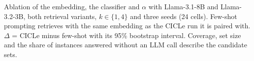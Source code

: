 \begin{table}[t]
  \centering
  \footnotesize
  \setlength{\tabcolsep}{4pt}
  \resizebox{\textwidth}{!}{}
  \caption{Ablation of the embedding, the classifier and $\alpha$ with Llama-3.1-8B and Llama-3.2-3B, both retrieval variants, $k \in \{1, 4\}$ and three seeds (24 cells). Few-shot prompting retrieves with the same embedding as the CICLe run it is paired with. $\Delta$ = CICLe minus few-shot with its 95\% bootstrap interval. Coverage, set size and the share of instances answered without an LLM call describe the candidate sets.}
  \label{tab:ablation}
\end{table}

